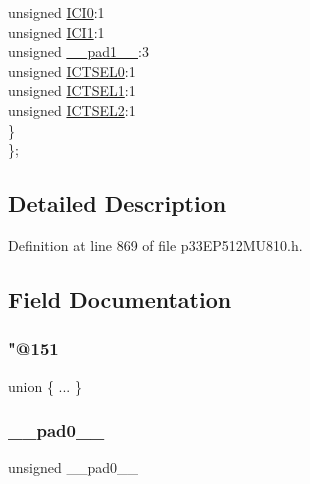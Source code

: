 \begin{DoxyCompactItemize}
\begin{tabbing}
\>\>unsigned \hyperlink{structtag_i_c7_c_o_n1_b_i_t_s_a6f1b5da2706b7c15fc8c9a01a30deaff}{ICI0}:1\\
\>\>unsigned \hyperlink{structtag_i_c7_c_o_n1_b_i_t_s_a7d5c777f0bc43f66f40462f79ed2179c}{ICI1}:1\\
\>\>unsigned \hyperlink{structtag_i_c7_c_o_n1_b_i_t_s_acaf2d0924a107ec6e8d2e31febaf66f9}{\_\_pad1\_\_}:3\\
\>\>unsigned \hyperlink{structtag_i_c7_c_o_n1_b_i_t_s_af6dd4d0e816b18462680d4b22fa926d3}{ICTSEL0}:1\\
\>\>unsigned \hyperlink{structtag_i_c7_c_o_n1_b_i_t_s_aa29140e739d886362537f87d199c4134}{ICTSEL1}:1\\
\>\>unsigned \hyperlink{structtag_i_c7_c_o_n1_b_i_t_s_a47d80892d449e6edbd5ba2ba9ff06deb}{ICTSEL2}:1\\
\>\} \\
\}; \\

\end{tabbing}\end{DoxyCompactItemize}


\subsection{Detailed Description}


Definition at line 869 of file p33\+E\+P512\+M\+U810.\+h.



\subsection{Field Documentation}
\mbox{\label{structtag_i_c7_c_o_n1_b_i_t_s_abfdcdf2f62002a82961f6382ce821d1b}} 
\subsubsection{\texorpdfstring{"@151}{@151}}
{\footnotesize\ttfamily union \{ ... \} }

\mbox{\label{structtag_i_c7_c_o_n1_b_i_t_s_adf71f3d8410c1f1dbbc96680a92c49af}} 
\subsubsection{\texorpdfstring{\+\_\+\+\_\+pad0\+\_\+\+\_\+}{\_\_pad0\_\_}}
{\footnotesize\ttfamily unsigned \+\_\+\+\_\+pad0\+\_\+\+\_\+}



